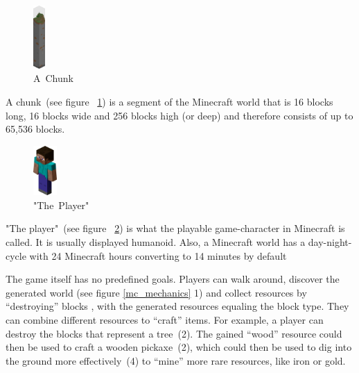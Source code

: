 \begin{figure}
  \begin{center}
    \includegraphics[width=0.04\textwidth]{graphics/chunk}
  \end{center}
  \caption{A~Chunk~\cite{image_mob}}
  \label{mc_chunk}
\end{figure}  

A chunk~(see figure ~\ref{mc_chunk}) is a segment of the Minecraft world that is 16 blocks long, 16 blocks wide and 256 blocks high (or deep) and therefore consists of up to 65,536 blocks.~\cite{mcwiki_chunks}

\begin{figure}
  \begin{center}
    \includegraphics[width=0.08\textwidth]{graphics/player}
  \end{center}
  \caption{"The~Player"~\cite{image_mob}}
  \label{mc_player}
\end{figure} 

"The player"~(see figure ~\ref{mc_player}) is what the playable game-character in Minecraft is called. It is usually displayed humanoid.
Also, a Minecraft world has a day-night-cycle with 24 Minecraft hours converting to 14 minutes by default

The game itself has no predefined goals. Players can walk around, discover the generated world (see figure \ref{mc_mechanics} 1) and collect resources by ``destroying'' blocks , with the generated resources equaling the block type. They can combine different resources to ``craft'' items. For example, a player can destroy the blocks that represent a tree~(2). The gained ``wood'' resource could then be used to craft a wooden pickaxe~(2), which could then be used to dig into the ground more effectively~(4) to ``mine'' more rare resources, like iron or gold.

